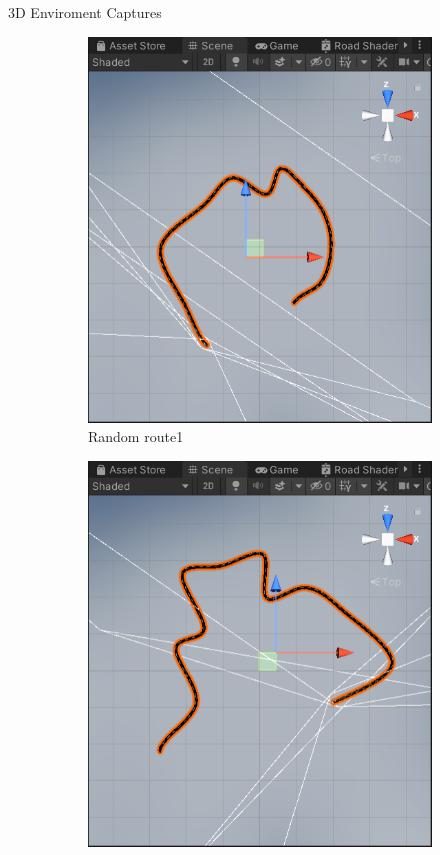 \documentclass[final]{beamer}
\newlength{\twocolwid}
\begin{document}
\begin{frame}[t]
\begin{columns}[t]
\begin{column}{\twocolwid}
\begin{alertblock}{3D Enviroment Captures}
\begin{figure}
\begin{subfigure}[bH]{0.15\textwidth}
        \includegraphics[width=\textwidth]{road1.PNG}
        \caption{Random route1}
        \label{fig:rr1}
    \end{subfigure}
    \hfill
    \begin{subfigure}[bH]{0.15\textwidth}
        \includegraphics[width=\textwidth]{road2.PNG}

\end{subfigure}
\end{figure}
\end{alertblock}
\end{column}
\end{columns}
\end{frame}
\end{document}

